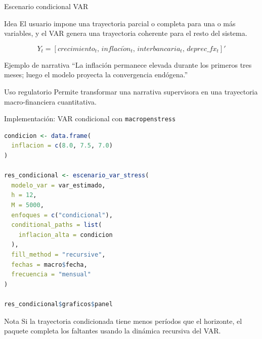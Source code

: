\documentclass[10pt,aspectratio=169]{beamer}
\begin{document}
\begin{frame}{Escenario condicional VAR}

\begin{block}{Idea}
El usuario impone una trayectoria parcial o completa para una o más variables, y el VAR genera una trayectoria coherente para el resto del sistema.
\end{block}

\[
Y_t =
\left[
crecimiento_t,\,
inflaci\acute{o}n_t,\,
interbancaria_t,\,
deprec\_fx_t
\right]'
\]

\begin{exampleblock}{Ejemplo de narrativa}
``La inflación permanece elevada durante los primeros tres meses; luego el modelo proyecta la convergencia endógena.''
\end{exampleblock}

\begin{alertblock}{Uso regulatorio}
Permite transformar una narrativa supervisora en una trayectoria macro-financiera cuantitativa.
\end{alertblock}

\end{frame}

\begin{frame}[fragile]{Implementación: VAR condicional con \texttt{macropenstress}}

\begin{lstlisting}[language=R,basicstyle=\ttfamily\scriptsize]
condicion <- data.frame(
  inflacion = c(8.0, 7.5, 7.0)
)

res_condicional <- escenario_var_stress(
  modelo_var = var_estimado,
  h = 12,
  M = 5000,
  enfoques = c("condicional"),
  conditional_paths = list(
    inflacion_alta = condicion
  ),
  fill_method = "recursive",
  fechas = macro$fecha,
  frecuencia = "mensual"
)

res_condicional$graficos$panel
\end{lstlisting}

\begin{block}{Nota}
Si la trayectoria condicionada tiene menos períodos que el horizonte, el paquete completa los faltantes usando la dinámica recursiva del VAR.
\end{block}

\end{frame}
\end{document}
